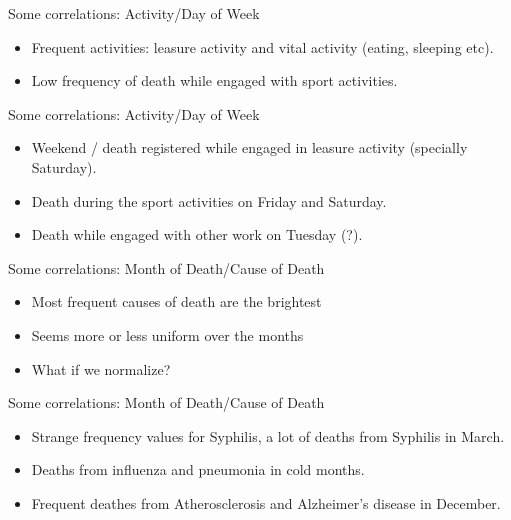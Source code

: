 \documentclass[xcolor=table]{beamer}
\begin{document}
     \begin{frame}{Some correlations: Activity/Day of Week}
     	\begin{itemize}
			\item Frequent activities: leasure activity and vital activity (eating, sleeping etc).
			\item Low frequency of death while engaged with sport activities.
		\end{itemize}
     	\begin{center}
		 \end{center}
     \end{frame}
     
     \begin{frame}{Some correlations: Activity/Day of Week}
     	\begin{itemize}
			\item Weekend / death registered while engaged in leasure activity (specially Saturday).
			\item Death during the sport activities on Friday and Saturday.
			\item Death while engaged with other work on Tuesday (?).
		\end{itemize}
     	\begin{center}
		 \end{center}
     \end{frame}
     
     
     \begin{frame}{Some correlations: Month of Death/Cause of Death}
     	\begin{itemize}
			\item Most frequent causes of death are the brightest
			\item Seems more or less uniform over the months
			\item What if we normalize?
		\end{itemize}
     	\begin{center}
		 \end{center}
     \end{frame}
     
     \begin{frame}{Some correlations: Month of Death/Cause of Death}
     	\begin{itemize}
			\item Strange frequency values for Syphilis, a lot of deaths from Syphilis in March.
			\item Deaths from influenza and pneumonia in cold months.
			\item Frequent deathes from Atherosclerosis and Alzheimer's disease in December.
		\end{itemize}
     	\begin{center}
		 \end{center}
     \end{frame}
\end{document}
